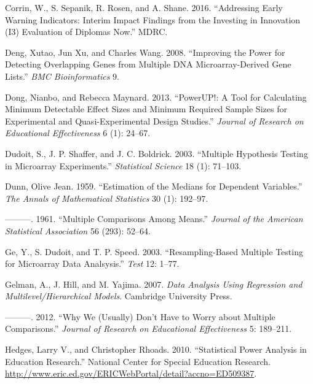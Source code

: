 \documentclass{article}
\newlength{\cslhangindent}
\newlength{\cslentryspacingunit} %
\newenvironment{CSLReferences}[2] %
 {%
  \setlength{\parindent}{0pt}
  \ifodd #1
  \let\oldpar\par
  \def\par{\hangindent=\cslhangindent\oldpar}
  \fi
  \setlength{\parskip}{#2\cslentryspacingunit}
 }%
 {}
\begin{document}
\begin{CSLReferences}{1}{0}
\leavevmode{}%
Corrin, W., S. Sepanik, R. Rosen, and A. Shane. 2016. {``Addressing
Early Warning Indicators: Interim Impact Findings from the Investing in
Innovation (I3) Evaluation of Diplomas Now.''} MDRC.

\leavevmode{}%
Deng, Xutao, Jun Xu, and Charles Wang. 2008. {``Improving the Power for
Detecting Overlapping Genes from Multiple DNA Microarray-Derived Gene
Lists.''} \emph{BMC Bioinformatics} 9.

\leavevmode{}%
Dong, Nianbo, and Rebecca Maynard. 2013. {``PowerUP!: A Tool for
Calculating Minimum Detectable Effect Sizes and Minimum Required Sample
Sizes for Experimental and Quasi-Experimental Design Studies.''}
\emph{Journal of Research on Educational Effectiveness} 6 (1): 24--67.

\leavevmode{}%
Dudoit, S., J. P. Shaffer, and J. C. Boldrick. 2003. {``Multiple
Hypothesis Testing in Microarray Experiments.''} \emph{Statistical
Science} 18 (1): 71--103.

\leavevmode{}%
Dunn, Olive Jean. 1959. {``Estimation of the Medians for Dependent
Variables.''} \emph{The Annals of Mathematical Statistics} 30 (1):
192--97.

\leavevmode{}%
---------. 1961. {``Multiple Comparisons Among Means.''} \emph{Journal
of the American Statistical Association} 56 (293): 52--64.

\leavevmode{}%
Ge, Y., S. Dudoit, and T. P. Speed. 2003. {``Resampling-Based Multiple
Testing for Microarray Data Analsysis.''} \emph{Test} 12: 1--77.

\leavevmode{}%
Gelman, A., J. Hill, and M. Yajima. 2007. \emph{Data Analysis Using
Regression and Multilevel/Hierarchical Models}. Cambridge University
Press.

\leavevmode{}%
---------. 2012. {``Why We (Usually) Don't Have to Worry about Multiple
Comparisons.''} \emph{Journal of Research on Educational Effectiveness}
5: 189--211.

\leavevmode{}%
Hedges, Larry V., and Christopher Rhoads. 2010. {``Statistical Power
Analysis in Education Research.''} National Center for Special Education
Research.
\url{http://www.eric.ed.gov/ERICWebPortal/detail?accno=ED509387}.


\end{CSLReferences}
\end{document}

